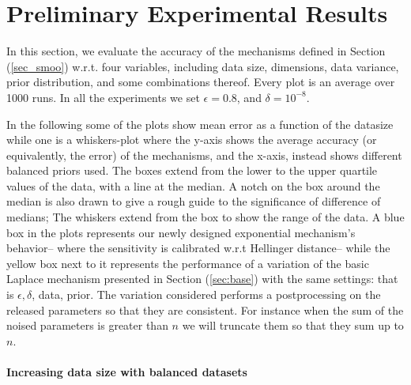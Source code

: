 \documentclass[sigconf]{acmart}
\begin{document}
\section{Preliminary Experimental Results}
\label{sec_experiment}
In this section, we evaluate the accuracy of the mechanisms defined in
Section (\ref{sec_smoo}) w.r.t. four variables, including data size, dimensions,
data variance, prior distribution, and some combinations thereof.
Every plot is an average over 1000 runs. In all the experiments we set
$\epsilon = 0.8$, and $\delta = 10^{-8}$.

\noindent In the following some of the plots show
mean error as a function of the datasize while one
is a whiskers-plot where the y-axis shows the average
accuracy (or equivalently, the error) of the mechanisms, and the x-axis, instead shows
different balanced priors used. The boxes extend from the lower to the upper quartile values
of the data, with a line at the median. A notch on the box around the
median is also drawn to give a rough guide to the significance of
difference of medians; The whiskers extend from the box to show the
range of the data. A blue box in the plots represents our newly
designed exponential mechanism's behavior-- where the sensitivity is calibrated
w.r.t Hellinger distance-- while the yellow box next to
it represents the performance of a variation of the basic Laplace
mechanism presented in Section (\ref{sec:base}) with the same
settings: that is $\epsilon, \delta$, data, prior. The variation
considered performs a postprocessing on the released parameters so
that they are consistent. For instance when the sum of the noised
parameters is greater than $n$ we will truncate them so that they sum
up to $n$.

\paragraph{Increasing data size with balanced datasets}
\label{subsubsec_vs_datasize}
\end{document}
